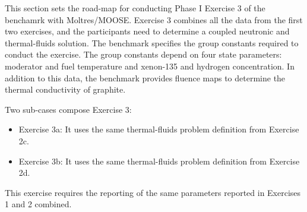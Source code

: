 This section sets the road-map for conducting Phase I Exercise 3 of the benchamrk with Moltres/MOOSE.
Exercise 3 combines all the data from the first two exercises, and the participants need to determine a coupled neutronic and thermal-fluids solution.
The benchmark specifies the group constants required to conduct the exercise.
The group constants depend on four state parameters: moderator and fuel temperature and xenon-135 and hydrogen concentration.
In addition to this data, the benchmark provides fluence maps to determine the thermal conductivity of graphite.

Two sub-cases compose Exercise 3:
\begin{itemize}
  \item Exercise 3a: It uses the same thermal-fluids problem definition from Exercise 2c.
  \item Exercise 3b: It uses the same thermal-fluids problem definition from Exercise 2d.
\end{itemize}

This exercise requires the reporting of the same parameters reported in Exercises 1 and 2 combined.